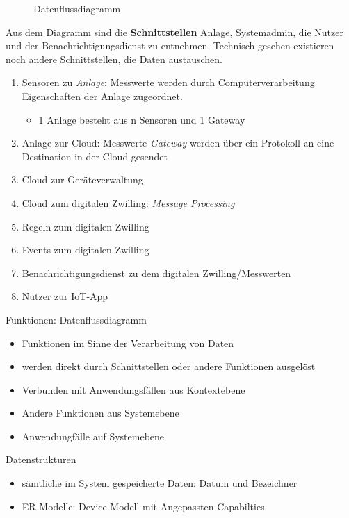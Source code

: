 \begin{figure}[ht!]
  \centering
  \noindent{}
  \caption[Datenflussdiagramm]{Datenflussdiagramm}
  \label{dataflow}
\end{figure}

\noindent Aus dem Diagramm sind die \textbf{Schnittstellen} Anlage, Systemadmin, die Nutzer und der Benachrichtigungsdienst zu entnehmen. Technisch gesehen existieren noch andere Schnittstellen, die Daten austauschen.

\begin{enumerate}
  \item Sensoren zu \textit{Anlage}: Messwerte werden durch Computerverarbeitung Eigenschaften der Anlage zugeordnet. \begin{itemize}
    \item 1 Anlage besteht aus n Sensoren und 1 Gateway
  \end{itemize}
  \item Anlage zur Cloud: Messwerte \textit{Gateway} werden über ein Protokoll an eine Destination in der Cloud gesendet
  \item Cloud zur Geräteverwaltung
  \item Cloud zum digitalen Zwilling: \textit{Message Processing}
  \item Regeln zum digitalen Zwilling
  \item Events zum digitalen Zwilling
  \item Benachrichtigungsdienst zu dem digitalen Zwilling/Messwerten
  \item Nutzer zur IoT-App
\end{enumerate}

Funktionen: Datenflussdiagramm
\begin{itemize}
  \item Funktionen im Sinne der Verarbeitung von Daten
  \item werden direkt durch Schnittstellen oder andere Funktionen ausgelöst
  \item Verbunden mit Anwendungsfällen aus Kontextebene
  \item Andere Funktionen aus Systemebene
  \item Anwendungfälle auf Systemebene
\end{itemize}

Datenstrukturen

\begin{itemize}
  \item sämtliche im System gespeicherte Daten: Datum und Bezeichner
  \item ER-Modelle: Device Modell mit Angepassten Capabilties
\end{itemize}



